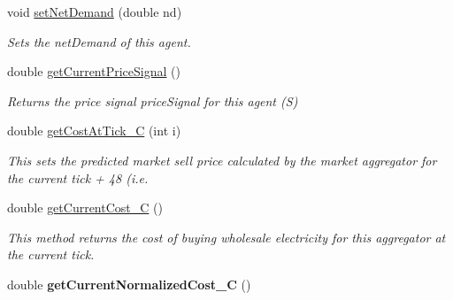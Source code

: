 \begin{DoxyCompactItemize}
\item 
void \hyperlink{classuk_1_1ac_1_1dmu_1_1iesd_1_1cascade_1_1agents_1_1aggregators_1_1_aggregator_agent_afbfee2f11504caeea90b81f24dadff58}{set\-Net\-Demand} (double nd)
\begin{DoxyCompactList}\small\item\em Sets the {\ttfamily net\-Demand} of this agent. \end{DoxyCompactList}\item 
double \hyperlink{classuk_1_1ac_1_1dmu_1_1iesd_1_1cascade_1_1agents_1_1aggregators_1_1_aggregator_agent_aa68555f4ca9c3a70242d0c9a3cad51fb}{get\-Current\-Price\-Signal} ()
\begin{DoxyCompactList}\small\item\em Returns the price signal {\ttfamily price\-Signal} for this agent (S) \end{DoxyCompactList}\item 
double \hyperlink{classuk_1_1ac_1_1dmu_1_1iesd_1_1cascade_1_1agents_1_1aggregators_1_1_aggregator_agent_ad41ede2c99b58c7eb7ce982e62642349}{get\-Cost\-At\-Tick\-\_\-\-C} (int i)
\begin{DoxyCompactList}\small\item\em This sets the predicted market sell price calculated by the market aggregator for the current tick + 48 (i.\-e. \end{DoxyCompactList}\item 
\hypertarget{classuk_1_1ac_1_1dmu_1_1iesd_1_1cascade_1_1agents_1_1aggregators_1_1_aggregator_agent_aad076ca9dcbb2fc46d1f123574c93ac7}{double \hyperlink{classuk_1_1ac_1_1dmu_1_1iesd_1_1cascade_1_1agents_1_1aggregators_1_1_aggregator_agent_aad076ca9dcbb2fc46d1f123574c93ac7}{get\-Current\-Cost\-\_\-\-C} ()}\label{classuk_1_1ac_1_1dmu_1_1iesd_1_1cascade_1_1agents_1_1aggregators_1_1_aggregator_agent_aad076ca9dcbb2fc46d1f123574c93ac7}

\begin{DoxyCompactList}\small\item\em This method returns the cost of buying wholesale electricity for this aggregator at the current tick. \end{DoxyCompactList}\item 
\hypertarget{classuk_1_1ac_1_1dmu_1_1iesd_1_1cascade_1_1agents_1_1aggregators_1_1_aggregator_agent_acb67a6e30c7a74052e5412c313f78c17}{double {\bfseries get\-Current\-Normalized\-Cost\-\_\-\-C} ()}\label{classuk_1_1ac_1_1dmu_1_1iesd_1_1cascade_1_1agents_1_1aggregators_1_1_aggregator_agent_acb67a6e30c7a74052e5412c313f78c17}


\end{DoxyCompactItemize}

